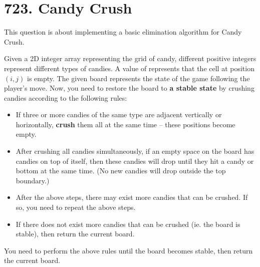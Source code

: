 \section{723. Candy Crush}
This question is about implementing a basic elimination algorithm for Candy Crush.

Given a 2D integer array  representing the grid of candy, different positive integers represent different types of candies. A value of  represents that the cell at position $(i, j)$ is empty. The given board represents the state of the game following the player's move. Now, you need to restore the board to \textbf{a stable state} by crushing candies according to the following rules:

\begin{itemize}
\item If three or more candies of the same type are adjacent vertically or horizontally, \textbf{crush} them all at the same time -- these positions become empty.
\item After crushing all candies simultaneously, if an empty space on the board has candies on top of itself, then these candies will drop until they hit a candy or bottom at the same time. (No new candies will drop outside the top boundary.)
\item After the above steps, there may exist more candies that can be crushed. If so, you need to repeat the above steps.
\item If there does not exist more candies that can be crushed (ie. the board is stable), then return the current board.
\end{itemize}

You need to perform the above rules until the board becomes stable, then return the current board.


